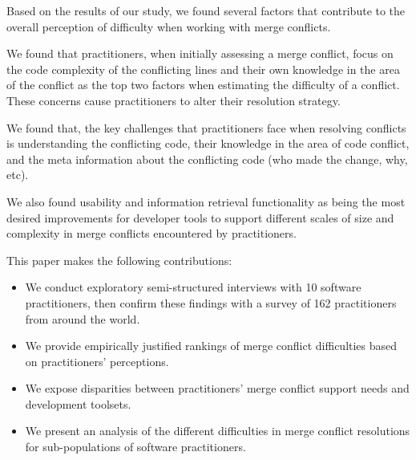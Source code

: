Based on the results of our study, we found several factors that contribute to the overall perception of difficulty when working with merge conflicts.

We found that practitioners, when initially assessing a merge conflict, focus on the code complexity of the conflicting lines and their own knowledge in the area of the conflict as the top two factors when estimating the difficulty of a conflict. These concerns cause practitioners to alter their resolution strategy.

We found that, the key challenges that practitioners face when resolving conflicts is understanding the conflicting code, their knowledge in the area of code conflict, and the meta information about the conflicting code (who made the change, why, etc).

We also found usability and information retrieval functionality as being the most desired improvements for developer tools to support different scales of size and complexity in merge conflicts encountered by practitioners.

This paper makes the following contributions:
\begin{itemize}
\item We conduct exploratory semi-structured interviews with 10 software practitioners, then confirm these findings with a survey of 162 practitioners from around the world.
\item We provide empirically justified rankings of merge conflict difficulties based on practitioners' perceptions.
\item We expose disparities between practitioners' merge conflict support needs and development toolsets.
\item We present an analysis of the different difficulties in merge conflict resolutions for sub-populations of software practitioners.
\end{itemize}